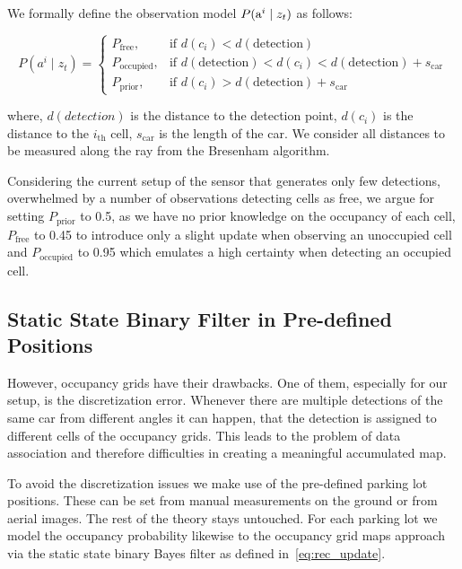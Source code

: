 We formally define the observation model $P({\mbox{a}^i} \mid z_t)$ as follows:

\begin{equation}
\label{eq:observation_model}
P(a^i \mid z_t) = \begin{cases} P_{\mathrm{free}}, & \mbox{if } d(c_i) < d(\mathrm{detection}) \\ P_{\mathrm{occupied}}, & \mbox{if } d(\mathrm{detection}) < d(c_i) < d(\mathrm{detection}) + s_{\mathrm{car}} \\ P_{\mathrm{prior}}, & \mbox{if } d(c_i) > d(\mathrm{detection}) + s_{\mathrm{car}} \end{cases}
\end{equation}

where, $d(detection)$ is the distance to the detection point, $d(c_i)$ is the
distance to the $i_\mathrm{th}$ cell, $s_\mathrm{car}$ is the length of the car. We consider
all distances to be measured along the ray from the Bresenham algorithm.

Considering the current setup of the sensor that generates only few
detections, overwhelmed by a number of observations detecting cells as free,
we argue for setting $P_{\mathrm{prior}}$ to 0.5, as we have no prior
knowledge on the occupancy of each cell, $P_{\mathrm{free}}$ to 0.45 to
introduce only a slight update when observing an unoccupied cell and
$P_{\mathrm{occupied}}$ to 0.95 which emulates a high certainty when detecting
an occupied cell.


\subsection{Static State Binary Filter in Pre-defined Positions}
\label{sub:static_state_binary_filter_in_pre_defined_positions}

However, occupancy grids have their drawbacks. One of them, especially for our
setup, is the discretization error. Whenever there are multiple detections of
the same car from different angles it can happen, that the detection is
assigned to different cells of the occupancy grids. This leads to the problem
of data association and therefore difficulties in creating a meaningful
accumulated map.

To avoid the discretization issues we make use of the pre-defined parking lot
positions. These can be set from manual measurements on the ground or from
aerial images. The rest of the theory stays untouched. For each parking lot we
model the occupancy probability likewise to the occupancy grid maps approach
via the static state binary Bayes filter as defined in~\eqref{eq:rec_update}.

